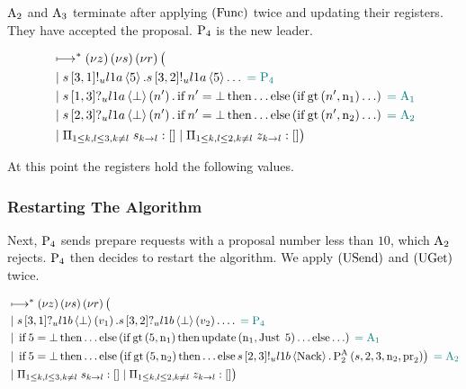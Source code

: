 $\operatorname{A_{2}}$ and $\operatorname{A_{3}}$ terminate after applying $\left(\operatorname{Func}\right)$ twice and updating their registers.
They have accepted the proposal.
$\operatorname{P_{4}}$ is the new leader.

\begin{align*}
&\longmapsto^*\left(\nu z\right)\left(\nu s\right)\left(\nu r\right)\big (\\
&\; | \;
s\left[3, 1\right]!_u l1a \left\langle 5 \right\rangle.
s\left[3, 2\right]!_u l1a \left\langle 5 \right\rangle\ldots
\;\textcolor{teal}{= \operatorname{P_{4}}}\\
&\; | \;
    s\left[1, 3\right]?_u l1a \left\langle \bot \right\rangle \left(n'\right).
    \operatorname{if} n' = \bot
    \operatorname{then} \ldots
    \operatorname{else} \left(
        \operatorname{if} \operatorname{gt}\left(n', \operatorname{n}_1\right)
        \ldots
    \right)
    \;\textcolor{teal}{= \operatorname{A_{1}}}\\
&\; | \;
    s\left[2, 3\right]?_u l1a \left\langle \bot \right\rangle \left(n'\right).
    \operatorname{if} n' = \bot
    \operatorname{then} \ldots
    \operatorname{else} \left(
        \operatorname{if} \operatorname{gt}\left(n', \operatorname{n}_2\right)
        \ldots
    \right)
    \;\textcolor{teal}{= \operatorname{A_{2}}}\\
&\; | \; \Pi_{1 \le k,l \le 3, k \neq l}\; s_{k\to l}:[]
\; | \; \Pi_{1 \le k,l \le 2, k \neq l}\; z_{k\to l}:[]
\big )
\end{align*}

At this point the registers hold the following values.


\subsubsection{Restarting The Algorithm}
Next, $\operatorname{P_{4}}$ sends prepare requests with a proposal number less than $10$, which $\operatorname{A_{2}}$ rejects.
$\operatorname{P_{4}}$ then decides to restart the algorithm.
We apply $\left(\operatorname{USend}\right)$ and $\left(\operatorname{UGet}\right)$ twice.

\begin{align*}
&\mapstostar\NuChannels\big (\\
&\Or
    \ReceiveUnreliableP{\ChannelS}{3}{1}{\LOneB}{\bot}{v_1}.
    \ReceiveUnreliableP{\ChannelS}{3}{2}{\LOneB}{\bot}{v_2}.
    \ldots
    \comment{= \Proposer{4}}\\
&\Or
    \If{5 = \bot}
    \Then{\ldots}
    \Else{\Paren{
        \If{\greaterThan{5}{\NumberRegister_1}}
        \Then{
            \update{\NumberRegister_1}{\Just{5}}\ldots
        }
        \Else{\ldots}
    }}
    \comment{= \Acceptor{1}}\\
&\Or
    \If{5 = \bot}
    \Then{\ldots}
    \Else{\Paren{
        \If{\greaterThan{5}{\NumberRegister_2}}
        \Then{\ldots}
        \Else{
            \SendUnreliableP{\ChannelS}{2}{3}{\LOneB}{\Nack}.
            \Call{\PaTwo}{\ChannelS, 2, 3, \NumberRegister_2, \ProposalRegister_2}
        }
    }}
    \comment{= \Acceptor{2}}\\
&\Or \InnerSessionQueues{\ChannelS}
\Or \OuterSessionQueues
\big )
\end{align*}

